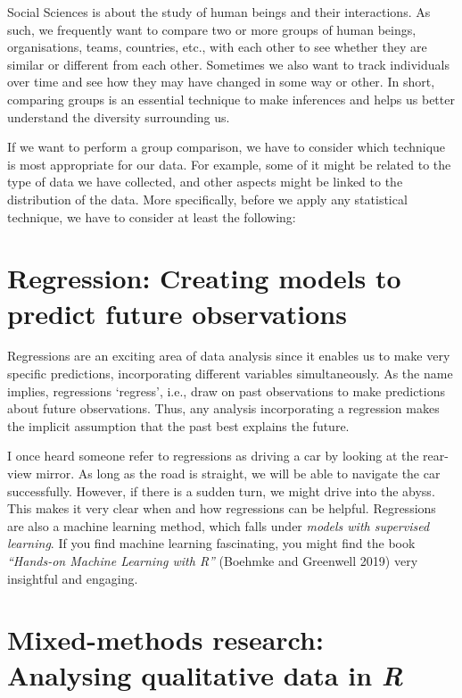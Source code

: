 \documentclass[
  letterpaper,
]{krantz}
\begin{document}
Social Sciences is about the study of human beings and their
interactions. As such, we frequently want to compare two or more groups
of human beings, organisations, teams, countries, etc., with each other
to see whether they are similar or different from each other. Sometimes
we also want to track individuals over time and see how they may have
changed in some way or other. In short, comparing groups is an essential
technique to make inferences and helps us better understand the
diversity surrounding us.

If we want to perform a group comparison, we have to consider which
technique is most appropriate for our data. For example, some of it
might be related to the type of data we have collected, and other
aspects might be linked to the distribution of the data. More
specifically, before we apply any statistical technique, we have to
consider at least the following:


\chapter{Regression: Creating models to predict future
observations}\label{regression}

Regressions are an exciting area of data analysis since it enables us to
make very specific predictions, incorporating different variables
simultaneously. As the name implies, regressions `regress', i.e., draw
on past observations to make predictions about future observations.
Thus, any analysis incorporating a regression makes the implicit
assumption that the past best explains the future.

I once heard someone refer to regressions as driving a car by looking at
the rear-view mirror. As long as the road is straight, we will be able
to navigate the car successfully. However, if there is a sudden turn, we
might drive into the abyss. This makes it very clear when and how
regressions can be helpful. Regressions are also a machine learning
method, which falls under \emph{models with supervised learning}. If you
find machine learning fascinating, you might find the book
\emph{``Hands-on Machine Learning with R''} (Boehmke and Greenwell 2019)
very insightful and engaging.


\chapter{\texorpdfstring{Mixed-methods research: Analysing qualitative
data in
\emph{R}}{Mixed-methods research: Analysing qualitative data in R}}\label{mixed-methods-research}
\end{document}
